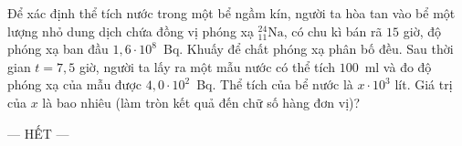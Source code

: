 	\begin{ex}%
		Để xác định thể tích nước trong một bể ngầm kín, người ta hòa tan vào bể một lượng nhỏ dung dịch chứa đồng vị phóng xạ ${}^{24}_{11}\text{Na}$, có chu kì bán rã $15$ giờ, độ phóng xạ ban đầu $1{,}6\cdot 10^8$~Bq. Khuấy để chất phóng xạ phân bố đều. Sau thời gian $t=7{,}5$ giờ, người ta lấy ra một mẫu nước có thể tích $100$~ml và đo độ phóng xạ của mẫu được $4{,}0\cdot 10^2$~Bq. Thể tích của bể nước là $x\cdot 10^3$ lít. Giá trị của $x$ là bao nhiêu (làm tròn kết quả đến chữ số hàng đơn vị)?
		\par
	\end{ex}

	\centerline{--- HẾT ---}


